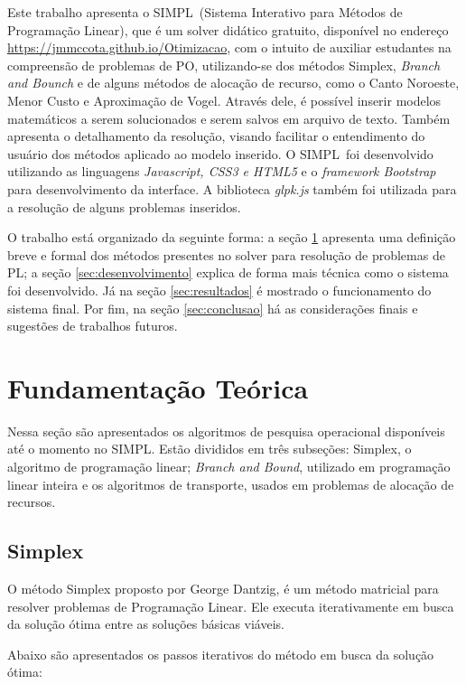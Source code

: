 \documentclass [11pt]{articleSBPO}
\newcommand{\sigla}[0] {SIMPL}
\newcommand{\nome}[0] {Sistema Interativo para Métodos de Programação Linear}
\newcommand{\urldosistema}[0] {\url{https://jmmccota.github.io/Otimizacao}}
\begin{document}
Este trabalho apresenta o \sigla\ (\nome), que é um solver didático gratuito, disponível no endereço \urldosistema, com o intuito de auxiliar estudantes na compreensão de problemas de PO, utilizando-se dos métodos Simplex, \textit{Branch and Bounch} e de alguns métodos de alocação de recurso, como o Canto Noroeste, Menor Custo e Aproximação de Vogel. Através dele, é possível inserir modelos matemáticos a serem solucionados e serem salvos em arquivo de texto. Também apresenta o detalhamento da resolução, visando facilitar o entendimento do usuário dos métodos aplicado ao modelo inserido. O \sigla\ foi desenvolvido utilizando as linguagens \textit{Javascript, CSS3 e HTML5} e o \textit{framework Bootstrap} para desenvolvimento da interface. A biblioteca \textit{glpk.js} também foi utilizada para a resolução de alguns problemas inseridos. 

O trabalho está organizado da seguinte forma: a seção \ref{sec:fundamentacao} apresenta uma definição breve e formal dos métodos presentes no solver para resolução de problemas de PL; a seção \ref{sec:desenvolvimento} explica de forma mais técnica como o sistema foi desenvolvido. Já na seção \ref{sec:resultados} é mostrado o funcionamento do sistema final. Por fim, na seção \ref{sec:conclusao} há as considerações finais e sugestões de trabalhos futuros.

\section{Fundamentação Teórica}\label{sec:fundamentacao}

Nessa seção são apresentados os algoritmos de pesquisa operacional disponíveis até o momento no \sigla. Estão divididos em três subseções: Simplex, o algoritmo de programação linear; \textit{Branch and Bound}, utilizado em programação linear inteira e os algoritmos de transporte, usados em problemas de alocação de recursos.

\subsection{Simplex}\label{subsec:Simplex}

O método Simplex proposto por George Dantzig, é um método matricial para resolver problemas de Programação Linear. Ele executa iterativamente em busca da solução ótima entre as soluções básicas viáveis. 

Abaixo são apresentados os passos iterativos do método em busca da solução ótima:
\end{document}
